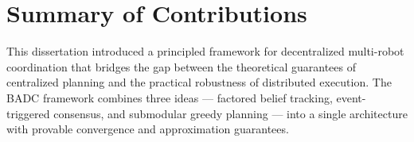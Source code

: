\section{Summary of Contributions}

This dissertation introduced a principled framework for decentralized multi-robot
coordination that bridges the gap between the theoretical guarantees of centralized
planning and the practical robustness of distributed execution. The BADC framework
combines three ideas --- factored belief tracking, event-triggered consensus, and
submodular greedy planning --- into a single architecture with provable convergence
and approximation guarantees.
